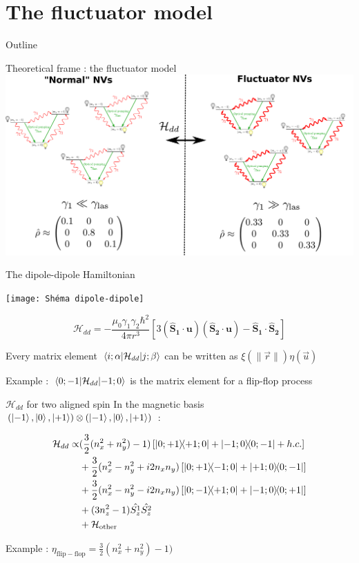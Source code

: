 \documentclass{beamer}
\begin{document}
\section{The fluctuator model}
\begin{frame}{Outline}
\tableofcontents[currentsection]
\end{frame}
\begin{frame}{Theoretical frame : the fluctuator model}
\centering
\includegraphics[width=\textwidth,height=0.9\textheight,keepaspectratio]{NV Vs Fluct}
\end{frame}
\begin{frame}{The dipole-dipole Hamiltonian}
\begin{center}
\texttt{[image: Shéma dipole-dipole]}
\end{center}

\begin{equation*}
  \mathcal{H}_{dd}=-\frac{\mu_0 \gamma_1 \gamma_2 \hbar ^2}{4 \pi r^3}[3(\mathbf{\hat{S}_1}\cdot \mathbf{u})(\mathbf{\hat{S}_2}\cdot \mathbf{u})-\mathbf{\hat{S}_1}\cdot \mathbf{\hat{S}_2}]
  \end{equation*}
  
  Every matrix element $\matrixel{i;\alpha}{\mathcal{H}_{dd}}{j;\beta}$ can be written as $\xi(\lVert \vec r \rVert)  \eta (\vec u)$ 
  
  \bigskip
  Example : $\matrixel{0;-1}{\mathcal{H}_{dd}}{-1;0}$ is the matrix element for a flip-flop process
\end{frame}
\begin{frame}{$\mathcal{H}_{dd}$ for two aligned spin}
In the magnetic basis $(\ket{-1},\ket{0},\ket{+1}) \otimes (\ket{-1},\ket{0},\ket{+1})$ :

\begin{align}
  \mathcal{H}_{dd}\propto &(\frac{3}{2}(n_x^2+n_y^2)-1)\left[\op{0;+1}{+1;0}+\op{-1;0}{0;-1} + h.c. \right]\\
  &+\frac{3}{2}(n_x^2-n_y^2+i2n_x n_y)\left[\op{0;+1}{-1;0}+\op{+1;0}{0;-1}\right]\\
  &+\frac{3}{2}(n_x^2-n_y^2-i2n_x n_y)\left[\op{0;-1}{+1;0}+\op{-1;0}{0;+1}\right]\\
  &+(3n_z^2-1)\hat{S_z^1}\hat{S_z^2}\\
  &+\mathcal{H}_{\mathrm{other}}
  \end{align}

Example : $\eta_{\mathrm{flip-flop}}=\frac{3}{2}(n_x^2+n_y^2)-1)$
\end{frame}
\end{document}
